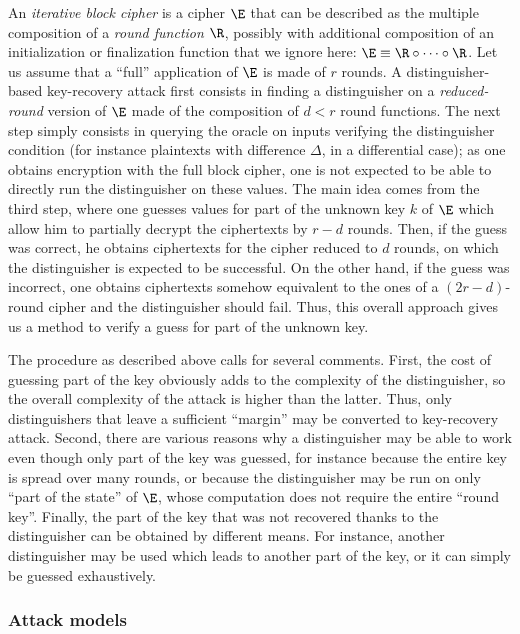 An \emph{iterative block cipher} is a cipher $\E$ that can be described as the multiple composition of a \emph{round function} $\R$, possibly with additional
composition of an initialization or finalization function that we ignore here: $\E \equiv \R \circ \cdots \circ \R$. Let us assume that a ``full''
application of $\E$ is made of $r$ rounds. A distinguisher-based key-recovery attack first consists in finding a distinguisher on
a \emph{reduced-round} version of $\E$ made of the composition of $d < r$ round functions. The next step simply consists in querying the oracle on inputs verifying the distinguisher condition (for instance
plaintexts with difference $\Delta$, in a differential case); as one obtains encryption with the full block cipher, one is not expected to be able to directly run the distinguisher
on these values. The main idea comes from the third step, where one guesses values for part of the unknown key $k$ of $\E$ which allow him to partially decrypt the ciphertexts by $r-d$ rounds. Then, if
the guess was correct, he obtains ciphertexts for the cipher reduced to $d$ rounds, on which the distinguisher is expected to be successful. On the other hand, if the guess was incorrect, one obtains
ciphertexts somehow equivalent to the ones of a $(2r-d)$-round cipher and the distinguisher should fail. Thus, this overall approach gives us a method to verify a guess for part of the unknown key.

The procedure as described above calls for several comments. First, the cost of guessing part of the key obviously adds to the complexity of the distinguisher, so the overall complexity of the attack
is higher than the latter. Thus, only distinguishers that leave a sufficient ``margin'' may be converted to key-recovery attack. Second, there are various reasons why a distinguisher may be able to work
even though only part of the key was guessed, for instance because the entire key is spread over many rounds, or because the distinguisher may be run on only ``part of the state'' of $\E$, whose computation
does not require the entire ``round key''. Finally, the part of the key that was not recovered thanks to the distinguisher can be obtained by different means. For instance, another distinguisher may be
used which leads to another part of the key, or it can simply be guessed exhaustively.


\subsubsection{Attack models}

